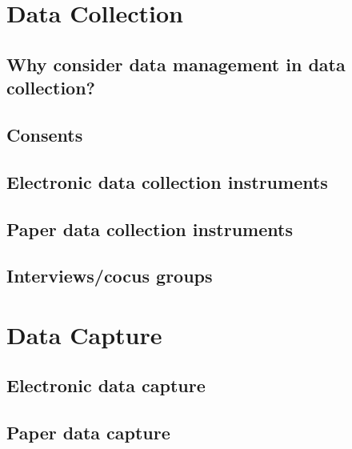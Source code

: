 \documentclass[
]{book}
\begin{document}
\hypertarget{data-collection}{%
\chapter{Data Collection}\label{data-collection}}

\hypertarget{why-consider-data-management-in-data-collection}{%
\section{Why consider data management in data collection?}\label{why-consider-data-management-in-data-collection}}

\hypertarget{consents}{%
\section{Consents}\label{consents}}

\hypertarget{electronic-data-collection-instruments}{%
\section{Electronic data collection instruments}\label{electronic-data-collection-instruments}}

\hypertarget{paper-data-collection-instruments}{%
\section{Paper data collection instruments}\label{paper-data-collection-instruments}}

\hypertarget{interviewscocus-groups}{%
\section{Interviews/cocus groups}\label{interviewscocus-groups}}

\hypertarget{data-capture}{%
\chapter{Data Capture}\label{data-capture}}

\hypertarget{electronic-data-capture}{%
\section{Electronic data capture}\label{electronic-data-capture}}

\hypertarget{paper-data-capture}{%
\section{Paper data capture}\label{paper-data-capture}}
\end{document}
